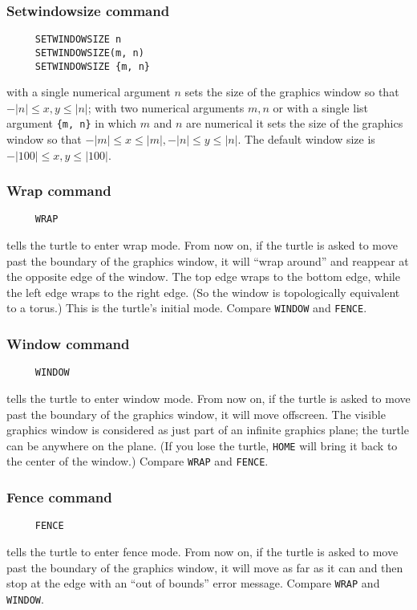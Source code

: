 \subsubsection*{Setwindowsize command}
\begin{verbatim}
     SETWINDOWSIZE n
     SETWINDOWSIZE(m, n)
     SETWINDOWSIZE {m, n}
\end{verbatim}
with a single numerical argument $n$ sets the size of the graphics
window so that $-|n| \le x,y \le |n|$; with two numerical arguments
$m, n$ or with a single list argument \texttt{\{m, n\}} in which $m$
and $n$ are numerical it sets the size of the graphics window so that
$-|m| \le x \le |m|, -|n| \le y \le |n|$.  The default window size is
$-|100| \le x,y \le |100|$.

\subsubsection*{Wrap command}
\begin{verbatim}
     WRAP
\end{verbatim}
tells the turtle to enter wrap mode.  From now on, if the turtle is
asked to move past the boundary of the graphics window, it will ``wrap
around'' and reappear at the opposite edge of the window.  The top
edge wraps to the bottom edge, while the left edge wraps to the right
edge.  (So the window is topologically equivalent to a torus.)  This
is the turtle's initial mode.  Compare \texttt{WINDOW} and
\texttt{FENCE}.

\subsubsection*{Window command}
\begin{verbatim}
     WINDOW
\end{verbatim}
tells the turtle to enter window mode.  From now on, if the turtle is
asked to move past the boundary of the graphics window, it will move
offscreen.  The visible graphics window is considered as just part of
an infinite graphics plane; the turtle can be anywhere on the plane.
(If you lose the turtle, \texttt{HOME} will bring it back to the
center of the window.)  Compare \texttt{WRAP} and \texttt{FENCE}.

\subsubsection*{Fence command}
\begin{verbatim}
     FENCE
\end{verbatim}
tells the turtle to enter fence mode.  From now on, if the turtle is
asked to move past the boundary of the graphics window, it will move
as far as it can and then stop at the edge with an ``out of bounds''
error message.  Compare \texttt{WRAP} and \texttt{WINDOW}.

